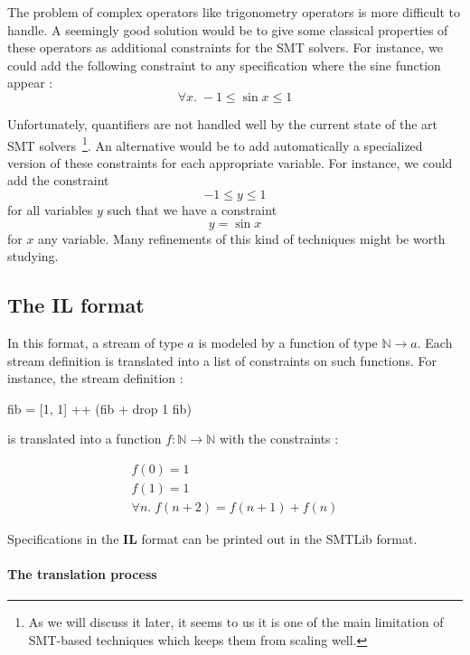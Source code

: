 \medskip

The problem of complex operators like trigonometry operators is more difficult to handle. A seemingly good solution would be to give some classical properties of these operators as additional constraints for the SMT solvers. For instance, we could add the following constraint to any specification where the sine function appear : \[ \forall x . \; -1 \leq \sin x \leq 1 \]

Unfortunately, quantifiers are not handled well by the current state of the art SMT solvers~\footnote{As we will discuss it later, it seems to us it is one of the main limitation of SMT-based techniques which keeps them from scaling well.}. An alternative would be to add automatically a specialized version of these constraints for each appropriate variable. For instance, we could add the constraint \[-1 \leq y \leq 1 \] for all variables $y$ such that we have a constraint \[ y = \sin x \] for $x$ any variable. Many refinements of this kind of techniques might be worth studying.





\subsection{The \textbf{IL} format}

In this format, a stream of type $a$ is modeled by a function of type $\mathbb{N} \to a$. Each stream definition is translated into a list of constraints on such functions. For instance, the stream definition :

\begin{code}
fib = [1, 1] ++ (fib + drop 1 fib)
\end{code}

is translated into a function $f : \mathbb{N} \to \mathbb{N}$ with the constraints :


$$
\begin{array}{c}
f(0) = 1 \\
f(1) = 1 \\
\forall n . \; f(n + 2) = f(n + 1) + f(n)
\end{array}
$$


\medskip

Specifications in the \textbf{IL} format can be printed out in the SMTLib format.

\paragraph{The translation process} 

